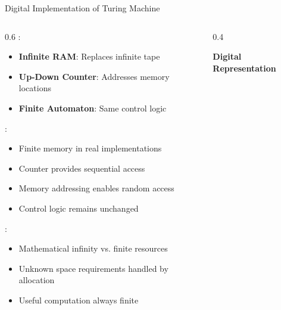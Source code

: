 \begin{frame}{Digital Implementation of Turing Machine}
\begin{columns}
\begin{column}{0.6\textwidth}
:
\begin{itemize}
\item \textbf{Infinite RAM}: Replaces infinite tape
\item \textbf{Up-Down Counter}: Addresses memory locations
\item \textbf{Finite Automaton}: Same control logic
\end{itemize}

\vspace{0.3cm}
:
\begin{itemize}
\item Finite memory in real implementations
\item Counter provides sequential access
\item Memory addressing enables random access
\item Control logic remains unchanged
\end{itemize}

\vspace{0.3cm}
:
\begin{itemize}
\item Mathematical infinity vs. finite resources
\item Unknown space requirements handled by allocation
\item Useful computation always finite
\end{itemize}
\end{column}
\begin{column}{0.4\textwidth}
\begin{center}
\textbf{Digital Representation}
\vspace{0.3cm}

\end{center}
\end{column}
\end{columns}
\end{frame}

